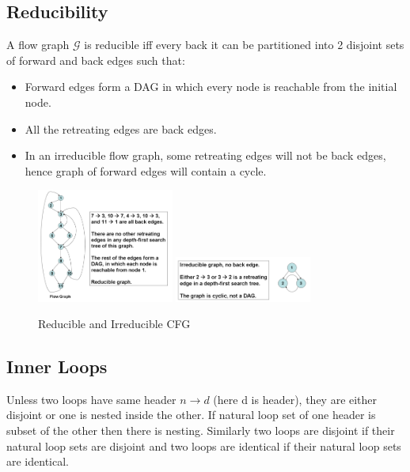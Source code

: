 \documentclass{article}
\begin{document}
\newpage

\subsection*{Reducibility}
A flow graph $\mathcal{G}$ is reducible iff every back it can be partitioned into 2 disjoint sets of forward and back edges such that:

\begin{itemize}
    \item Forward edges form a DAG in which every node is reachable from the initial node.
    \item All the retreating edges are back edges.
    \item In an irreducible flow graph, some retreating edges will not be back edges, hence graph of forward edges will contain a cycle.
\end{itemize}

\begin{figure}[h]
    \centering
    \includegraphics[width=0.4\textwidth]{Images/reducible.png}
    \includegraphics[width=0.4\textwidth]{Images/irreducible.png}
    \caption{Reducible and Irreducible CFG}
    \label{fig:cfg}
\end{figure}

\subsection*{Inner Loops}
Unless two loops have same header $n \longrightarrow d$ (here d is header), they are either disjoint or one is nested inside the other. If natural loop set of one header is subset of the other then there is nesting. Similarly two loops are disjoint if their natural loop sets are disjoint and two loops are identical if their natural loop sets are identical.
\end{document}
